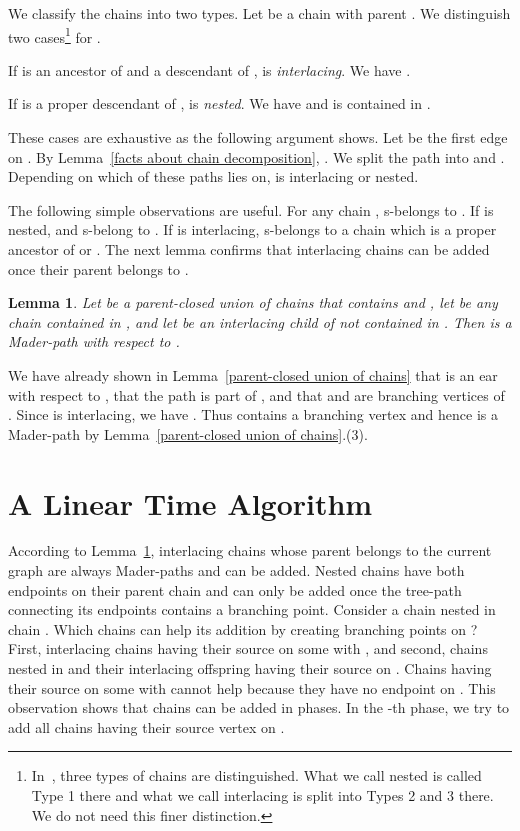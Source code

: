 \documentclass[paper=a4]{scrartcl}
\newtheorem{lemma}{Lemma}
\newcommand{\qed}{}
\newcommand{\mqed}{\hfill}
\newlength{\proofpostskipamount}\newlength{\proofpreskipamount}
\newenvironment{proof}{\par\vspace{\proofpreskipamount}\noindent{\textbf{Proof:}}\hspace{0.5em}}{\nopagebreak \strut\nopagebreak \hspace{\fill}\mqed\par\vspace{\proofpostskipamount}\noindent}
\begin{document}
We classify the chains  into two types. Let  be a chain with parent . We distinguish two cases\footnote{In~\cite{Schmidt2013}, three types of chains are distinguished. What we call nested is called Type 1 there and what we call interlacing is split into Types 2 and 3 there. We do not need this finer distinction.} for .
\begin{compactitem}
	\item If  is an ancestor of  and a descendant of ,  is \emph{interlacing}. We have .
	\item If  is a proper descendant of ,  is \emph{nested}. We have  and  is contained in .
\end{compactitem}
These cases are exhaustive as the following argument shows. Let  be the first edge on . By Lemma~\ref{facts about chain decomposition}, . We split the path  into  and . Depending on which of these paths  lies on,  is interlacing or nested.

The following simple observations are useful. For any chain ,  s-belongs to . If  is nested,  and  s-belong to . If  is interlacing,  s-belongs to a chain which is a proper ancestor of  or . The next lemma confirms that interlacing chains can be added once their parent belongs to .

\begin{lemma}\label{interlacing are easy}
Let  be a parent-closed union of chains that contains  and , let  be any chain contained in , and let  be an interlacing child of  not contained in . Then  is a Mader-path with respect to .
\end{lemma}
\begin{proof} We have already shown in Lemma~\ref{parent-closed union of chains} that  is an ear with respect to , that the path  is part of , and that  and  are branching vertices of . Since  is interlacing, we have . Thus  contains a branching vertex and hence  is a Mader-path by Lemma~\ref{parent-closed union of chains}.(3). \qed
\end{proof}

\section{A Linear Time Algorithm}\label{sec:linear time alg}


According to Lemma~\ref{interlacing are easy}, interlacing chains whose parent belongs to the current graph are always Mader-paths and can be added. Nested chains have both endpoints on their parent chain and can only be added once the tree-path connecting its endpoints contains a branching point. Consider a chain nested in chain . Which chains can help its addition by creating branching points on ? First,  interlacing chains having their source on some  with , and second, chains nested in  and their interlacing offspring having  their source on . Chains having their source on some  with  cannot help because they have no endpoint on . This observation shows that chains can be added in phases. In the -th phase, we try to add all chains having their source vertex on .
\end{document}
